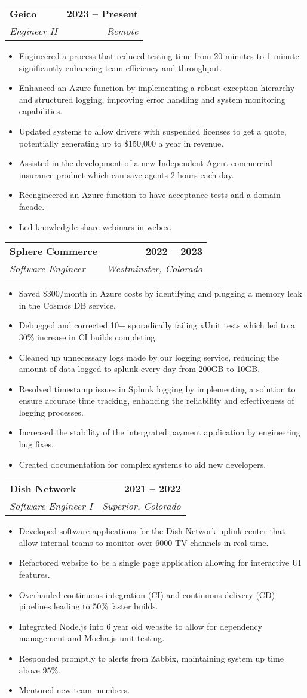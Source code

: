 \documentclass[letterpaper,11pt]{article}
\makeatletter
\newcommand{\resumeItem}[1]{
  \item\small{
    {#1 \vspace{-2pt}}
  }
}
\newcommand{\resumeSubheading}[4]{
  \vspace{-2pt}\item
    \begin{tabular*}{1.0\textwidth}[t]{l@{\extracolsep{\fill}}r}
      \textbf{#1} & \textbf{\small #2} \\
      \textit{\small#3} & \textit{\small #4} \\
    \end{tabular*}\vspace{-7pt}
}
\newcommand{\resumeItemListStart}{\begin{itemize}}
\newcommand{\resumeItemListEnd}{\end{itemize}\vspace{-5pt}}
\makeatother
\begin{document}
  	\resumeSubheading
      {Geico}{2023 -- Present}
      {Engineer II}{Remote}
      \resumeItemListStart
	\resumeItem{Engineered a process that reduced testing time from 20 minutes to 1 minute significantly enhancing team efficiency and throughput.}
	\resumeItem{Enhanced an Azure function by implementing a robust exception hierarchy and structured logging, improving error handling and system monitoring capabilities.}
        \resumeItem{Updated systems to allow drivers with suspended licenses to get a quote, potentially generating up to \$150,000 a year in revenue.}
        \resumeItem{Assisted in the development of a new Independent Agent commercial insurance product which can save agents 2 hours each day.}
	\resumeItem{Reengineered an Azure function to have acceptance tests and a domain facade. }
\resumeItem{Led knowledgde share webinars in webex. }
      \resumeItemListEnd

    \resumeSubheading
      {Sphere Commerce}{2022 -- 2023}
      {Software Engineer}{Westminster, Colorado}
      \resumeItemListStart
	\resumeItem{Saved \$300/month in Azure costs by identifying and plugging a memory leak in the Cosmos DB service.}
        \resumeItem{Debugged and corrected 10+ sporadically failing xUnit tests which led to a 30\% increase in CI builds completing.}
	\resumeItem{Cleaned up unnecessary logs made by our logging service, reducing the amount of data logged to splunk every day from 200GB to 10GB.}
        \resumeItem{Resolved timestamp issues in Splunk logging by implementing a solution to ensure accurate time tracking, enhancing the reliability and effectiveness of logging processes. }       
	\resumeItem{Increased the stability of the intergrated payment application by engineering bug fixes.}
	\resumeItem{Created documentation for complex systems to aid new developers.}
      \resumeItemListEnd

    \resumeSubheading
      {Dish Network}{2021 -- 2022}
      {Software Engineer I}{Superior, Colorado}
      \resumeItemListStart
        \resumeItem{Developed software applications for the Dish Network uplink center that allow internal teams to monitor over 6000 TV channels in real-time.}
	\resumeItem{Refactored website to be a single page application allowing for interactive UI features.}
	\resumeItem{Overhauled continuous integration (CI) and continuous delivery (CD) pipelines leading to 50\% faster builds.}
        \resumeItem{Integrated Node.js into 6 year old website to allow for dependency management and Mocha.js unit testing.}
        \resumeItem{Responded promptly to alerts from Zabbix, maintaining system up time above 95\%.}		
        \resumeItem{Mentored new team members.}
    \resumeItemListEnd
\end{document}
